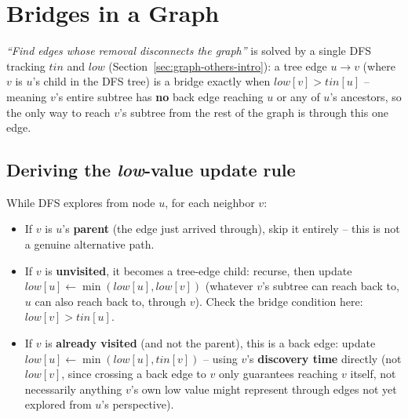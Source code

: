 \section{Bridges in a Graph}
\label{sec:graph-bridges}


\begin{patternbox}
\emph{``Find edges whose removal disconnects the graph''} is solved by
a single DFS tracking $\textit{tin}$ and $\textit{low}$
(Section~\ref{sec:graph-others-intro}): a tree edge $u \to v$ (where
$v$ is $u$'s child in the DFS tree) is a bridge exactly when
$\textit{low}[v] > \textit{tin}[u]$ -- meaning $v$'s entire subtree
has \textbf{no} back edge reaching $u$ or any of $u$'s ancestors, so
the only way to reach $v$'s subtree from the rest of the graph is
through this one edge.
\end{patternbox}

\subsection*{Deriving the \textit{low}-value update rule}

While DFS explores from node $u$, for each neighbor $v$:
\begin{itemize}
  \item If $v$ is $u$'s \textbf{parent} (the edge just arrived
        through), skip it entirely -- this is not a genuine
        alternative path.
  \item If $v$ is \textbf{unvisited}, it becomes a tree-edge child:
        recurse, then update $\textit{low}[u] \gets
        \min(\textit{low}[u], \textit{low}[v])$ (whatever $v$'s
        subtree can reach back to, $u$ can also reach back to, through
        $v$). Check the bridge condition here:
        $\textit{low}[v] > \textit{tin}[u]$.
  \item If $v$ is \textbf{already visited} (and not the parent), this
        is a back edge: update $\textit{low}[u] \gets
        \min(\textit{low}[u], \textit{tin}[v])$ -- using $v$'s
        \textbf{discovery time} directly (not $\textit{low}[v]$, since
        crossing a back edge to $v$ only guarantees reaching $v$
        itself, not necessarily anything $v$'s own low value might
        represent through edges not yet explored from $u$'s
        perspective).
\end{itemize}


